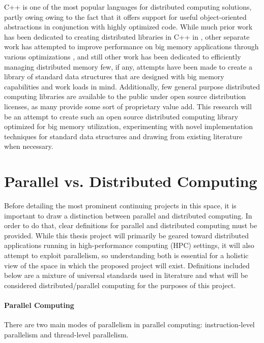 C++ is one of the most popular languages for distributed computing solutions, partly owing owing to the fact that it offers support for useful object-oriented abstractions in conjunction with highly optimized code. \cite{towards_dist_cpp} While much prior work has been dedicated to creating distributed libraries in C++ in \cite{STAPL}  \cite{practical_dist_c}
\cite{taskflow} \cite{intel_tbb} \cite{parallel_programming_w_charm} \cite{chapel} \cite{X10}, other separate work has attempted to improve performance on big memory applications through various optimizations \cite{virtual_memory_tlb}, and still other work has been dedicated to efficiently managing distributed memory \cite{spark} \cite{zookeeper} \cite{memcached} \cite{GAM}  few, if any, attempts have been made to create a library of standard data structures that are designed with big memory capabilities and work loads in mind. Additionally, few general purpose distributed computing libraries are available to the public under open source distribution licenses, as many provide some sort of proprietary value add. This research will be an attempt to create such an open source distributed computing library optimized for big memory utilization, experimenting with novel implementation techniques for standard data structures and drawing from existing literature when necessary. 
\section{Parallel vs. Distributed Computing}
Before detailing the most prominent continuing projects in this space, it is important to draw a distinction between parallel and distributed computing. In order to do that, clear definitions for parallel and distributed computing must be provided. While this thesis project will primarily be geared toward distributed applications running in high-performance computing (HPC) settings, it will also attempt to exploit parallelism, so understanding both is essential for a holistic view of the space in which the proposed project will exist. Definitions included below are a mixture of universal standards used in literature and what will be considered distributed/parallel computing for the purposes of this project.

\paragraph{Parallel Computing}
There are two main modes of parallelism in parallel computing: instruction-level parallelism and thread-level parallelism. 

